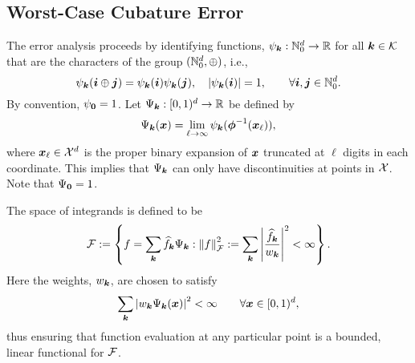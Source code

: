 \documentclass[12pt]{amsart}
\begin{document}
\subsection{Worst-Case Cubature Error}
The error analysis proceeds by identifying functions, $\psi_{\vk}:\natzero^d \to \reals$ for all $\vk \in \ck$ that are the characters of the group $(\natzero^d, \oplus)$, i.e., 
\begin{equation} \label{charDef}
    \psi_{\vk}(\vi \oplus \vj) = \psi_{\vk}(\vi) \psi_{\vk}(\vj), \quad \abs{\psi_{\vk}(\vi)} = 1, \qquad \forall \vi, \vj \in \natzero^d.
\end{equation}
By convention, $\psi_{\vzero} = 1$.  Let $\Psi_{\vk}:[0,1)^d \to \reals$ be defined by 
\begin{equation} \label{PsiDef}
    \Psi_{\vk}(\vx) = \lim_{\ell \to \infty}  \psi_{\vk}(\vphi^{-1}(\vx_\ell)), 
\end{equation}
where $\vx_\ell \in \cx^d$ is the proper binary expansion of $\vx$ truncated at $\ell$ digits in each coordinate.  This implies that $\Psi_{\vk}$ can only have discontinuities at points in $\cx$.  Note that $\Psi_{\vzero} = 1$.

The space of integrands is defined to be 
\begin{equation} \label{FSpaceDef}
    \cf : = \left \{ f = \sum_{\vk} \hf_{\vk} \Psi_{\vk} : \norm[\cf]{f}^2 := \sum_{\vk} \abs{\frac{\hf_{\vk}}{w_{\vk}}}^2 < \infty   \right \}.
\end{equation}
Here the weights, $w_{\vk}$, are chosen to satisfy
\begin{equation}
    \sum_{\vk} \abs{w_{\vk} \Psi_{\vk}(\vx)}^2 <  \infty \qquad \forall \vx \in [0,1)^d,
\end{equation}
thus ensuring that function evaluation at any particular point is a bounded, linear functional for $\cf$.
\end{document}

